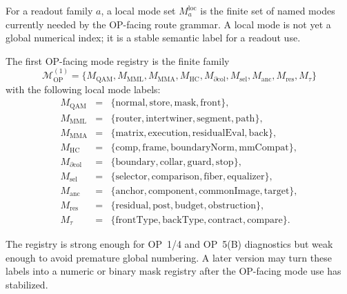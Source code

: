 \begin{definition}
\label{def:v410r20-local-mode-set}
For a readout family \(a\), a local mode set \(M_a^{\mathrm{loc}}\) is the
finite set of named modes currently needed by the OP-facing route grammar. A
local mode is not yet a global numerical index; it is a stable semantic label
for a readout use.
\end{definition}

\begin{definition}
\label{def:v410r20-first-op-facing-mode-registry}
The first OP-facing mode registry is the finite family
\[
 \mathcal M_{\mathrm{OP}}^{(1)}
 =
 \{M_{\mathrm{QAM}},M_{\mathrm{MML}},M_{\mathrm{MMA}},
 M_{\mathrm{HC}},M_{\partial\mathrm{col}},
 M_{\mathrm{sel}},M_{\mathrm{anc}},M_{\mathrm{res}},M_{\tau}\}
\]
with the following local mode labels:
\[
\begin{array}{rcl}
M_{\mathrm{QAM}} &=&
\{\mathrm{normal},\mathrm{store},\mathrm{mask},\mathrm{front}\},\\
M_{\mathrm{MML}} &=&
\{\mathrm{router},\mathrm{intertwiner},\mathrm{segment},\mathrm{path}\},\\
M_{\mathrm{MMA}} &=&
\{\mathrm{matrix},\mathrm{execution},\mathrm{residualEval},\mathrm{back}\},\\
M_{\mathrm{HC}} &=&
\{\mathrm{comp},\mathrm{frame},\mathrm{boundaryNorm},\mathrm{mmCompat}\},\\
M_{\partial\mathrm{col}} &=&
\{\mathrm{boundary},\mathrm{collar},\mathrm{guard},\mathrm{stop}\},\\
M_{\mathrm{sel}} &=&
\{\mathrm{selector},\mathrm{comparison},\mathrm{fiber},\mathrm{equalizer}\},\\
M_{\mathrm{anc}} &=&
\{\mathrm{anchor},\mathrm{component},\mathrm{commonImage},\mathrm{target}\},\\
M_{\mathrm{res}} &=&
\{\mathrm{residual},\mathrm{post},\mathrm{budget},\mathrm{obstruction}\},\\
M_{\tau} &=&
\{\mathrm{frontType},\mathrm{backType},\mathrm{contract},\mathrm{compare}\}.
\end{array}
\]
\end{definition}

\begin{remark}
\label{rem:v410r20-why-still-local}
The registry is strong enough for OP~1/4 and OP~5(B) diagnostics but weak
enough to avoid premature global numbering. A later version may turn these
labels into a numeric or binary mask registry after the OP-facing mode use has
stabilized.
\end{remark}

